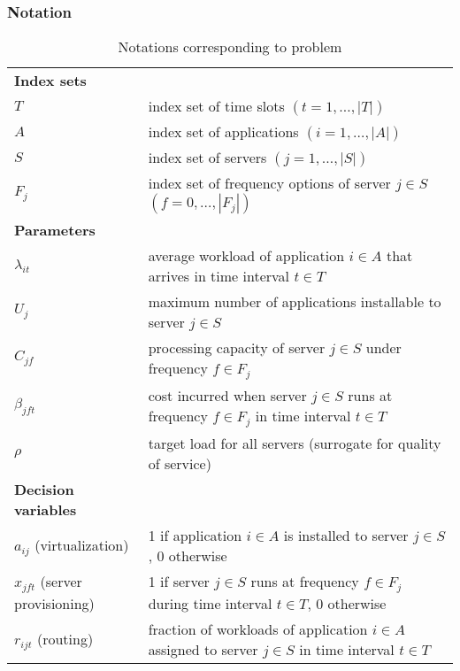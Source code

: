 \subsubsection{Notation}
\begin{table}[H]
	\caption{Notations corresponding to problem}
	\label{notation}
	\resizebox{\textwidth}{!}
	{
		\begin{tabular}{ll}
			\hline 
			\textbf{Index sets} &  \\ 
			$T$ & \textrm{index set of time slots $(t=1,\ldots,|T|)$} \\ 
			$A$ & \textrm{index set of applications $(i=1,\ldots,|A|)$} \\ 
			$S$ & \textrm{index set of servers $(j=1,\ldots,|S|)$}\\
			$F_j$ & \textrm{index set of frequency options of server $j\in S$ $(f=0,\ldots,|F_j|)$} \\ 
			\textbf{Parameters} &   \\ 
			$\lambda_{it}$ & \textrm{average workload of application $i\in A$ that arrives in time interval $t\in T$} \\ 
			$U_j$  & \textrm{maximum number of applications installable to server $j\in S$} \\ 
			$C_{jf}$ & \textrm{processing capacity of server $j\in S$ under frequency $f\in F_j$} \\ 
			$\beta_{jft}$ & \textrm{cost incurred when server $j\in S$ runs at frequency $f\in F_j$ in time interval $t\in T$} \\ 
			$\rho$ & \textrm{target load for all servers (surrogate for quality of service)}\\ 
			\textbf{Decision variables} &  \\ 
			$a_{ij}$ (virtualization) & \textrm{1 if application $i\in A$ is installed to server $j\in S$, 0 otherwise} \\ 
			$x_{jft}$ (server provisioning) & \textrm{1 if server $j\in S$ runs at frequency $f\in F_j$ during time interval $t\in T$, 0 otherwise} \\ 
			$r_{ijt}$ (routing) & \textrm{fraction of workloads of application $i\in A$ assigned to server $j\in S$ in time  interval $t\in T$}\\
			\hline
		\end{tabular}
	}
\end{table} 

